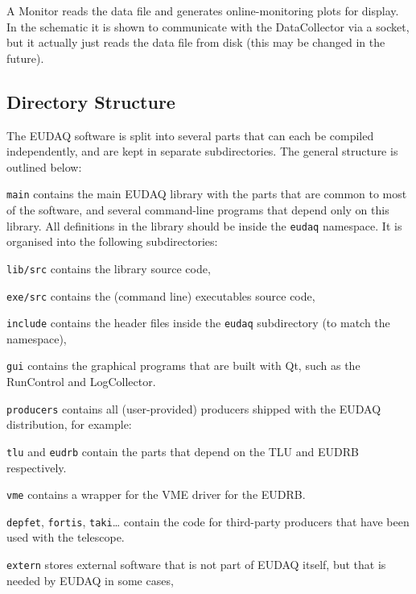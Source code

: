A Monitor reads the data file and generates online-monitoring plots for display.
In the schematic it is shown to communicate with the DataCollector via a socket,
but it actually just reads the data file from disk (this may be changed in the future).

\subsection{Directory Structure}
The EUDAQ software is split into several parts that can each be compiled independently,
and are kept in separate subdirectories.
The general structure is outlined below:

\begin{myitemize}
\item \texttt{main}
  contains the main EUDAQ library with the parts that are common to most of the software,
  and several command-line programs that depend only on this library.
  All definitions in the library should be inside the \texttt{eudaq} namespace.
  It is organised into the following subdirectories:
  \begin{myitemize}
  \item \texttt{lib/src}
    contains the library source code,
  \item \texttt{exe/src}
    contains the (command line) executables source code,
  \item \texttt{include}
    contains the header files inside the \texttt{eudaq} subdirectory (to match the namespace),
  \end{myitemize}
\item \texttt{gui}
  contains the graphical programs that are built with Qt, such as the RunControl and LogCollector.
\item \texttt{producers}
  contains all (user-provided) producers shipped with the EUDAQ
  distribution, for example:
  \begin{myitemize}
\item \texttt{tlu} and \texttt{eudrb}
  contain the parts that depend on the \gls{TLU} and \gls{EUDRB} respectively.
\item\texttt{vme}
  contains a wrapper for the VME driver for the \gls{EUDRB}.
\item \texttt{depfet}, \texttt{fortis}, \texttt{taki}\ldots{}
  contain the code for third-party producers that have been used with
  the telescope.
  \end{myitemize}
\item \texttt{extern}
  stores external software that is not part of EUDAQ itself, but that is needed by EUDAQ in some cases,

\end{myitemize}

